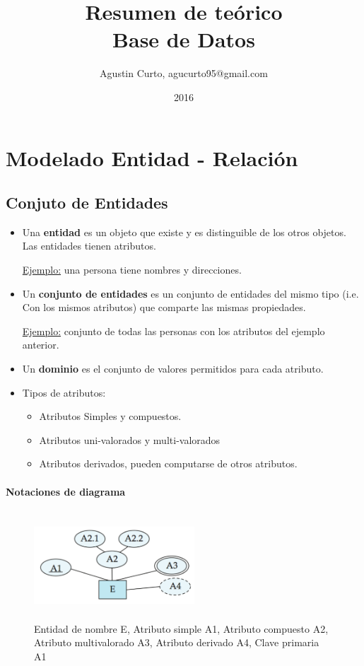 \documentclass[12pt,a4paper]{report}
\author{Agustin Curto, agucurto95@gmail.com}
\title{Resumen de teórico \\ Base de Datos}
\date{2016}
\begin{document}
\maketitle
\tableofcontents

\chapter{Modelado Entidad - Relación}
	\section{Conjuto de Entidades}
		\begin{itemize}
			\item Una \textbf{entidad} es un objeto que existe y es distinguible de los otros objetos. Las entidades tienen atributos.
			\par \underline{Ejemplo:} una persona tiene nombres y direcciones.
			\item Un \textbf{conjunto de entidades} es un conjunto de entidades del mismo tipo (i.e. Con los mismos atributos) que comparte las mismas propiedades.
			\par \underline{Ejemplo:} conjunto de todas las personas con los atributos del ejemplo anterior.
			\item Un \textbf{dominio} es el conjunto de valores permitidos para cada atributo. 
			
			\item Tipos de atributos:
				\begin{itemize}
					\item Atributos Simples y compuestos.
					\item Atributos uni-valorados y multi-valorados
					\item Atributos derivados, pueden computarse de otros atributos.
				\end{itemize}
		\end{itemize}
		
		\subsubsection{Notaciones de diagrama}
			\begin{figure}[htb]
				\centering
				\includegraphics[width=6cm, height=4cm]{./imagenes/entidad.png}
				\caption{Entidad de nombre E, Atributo simple A1, Atributo compuesto A2, Atributo multivalorado A3, Atributo derivado A4, Clave primaria A1}
			\end{figure}
\end{document}
